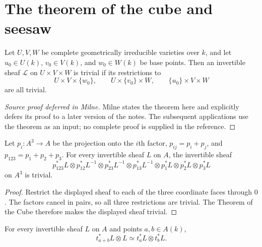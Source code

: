 \section{The theorem of the cube and seesaw}

\begin{theorem}
\label{thm:milne-cube}

Let $U,V,W$ be complete geometrically irreducible varieties over $k$, and let
$u_0\in U(k)$, $v_0\in V(k)$, and $w_0\in W(k)$ be base points.  Then an
invertible sheaf $\mathcal L$ on $U\times V\times W$ is trivial if its
restrictions to
\[
 U\times V\times\{w_0\},\qquad U\times\{v_0\}\times W,\qquad
 \{u_0\}\times V\times W
\]
are all trivial.
\end{theorem}

\begin{proof}[Source proof deferred in Milne]
Milne states the theorem here and explicitly defers its proof to a later
version of the notes.  The subsequent applications use the theorem as an
input; no complete proof is supplied in the reference.
\end{proof}

\begin{corollary}
\label{cor:milne-cube-line-bundle-identities}

Let $p_i:A^3\to A$ be the projection onto the $i$th factor,
$p_{ij}=p_i+p_j$, and $p_{123}=p_1+p_2+p_3$.  For every invertible sheaf $L$
on $A$, the invertible sheaf
\[
p_{123}^*L\otimes p_{12}^*L^{-1}\otimes p_{23}^*L^{-1}
 \otimes p_{13}^*L^{-1}\otimes p_1^*L\otimes p_2^*L\otimes p_3^*L
\]
on $A^3$ is trivial.
\end{corollary}

\begin{proof}
Restrict the displayed sheaf to each of the three coordinate faces through
$0$.  The factors cancel in pairs, so all three restrictions are trivial.  The
Theorem of the Cube therefore makes the displayed sheaf trivial.
\end{proof}

\begin{theorem}
\label{thm:milne-square}

For every invertible sheaf $L$ on $A$ and points $a,b\in A(k)$,
\[
 t_{a+b}^*L\otimes L\simeq t_a^*L\otimes t_b^*L.
\]
\end{theorem}

